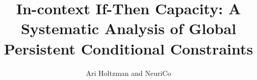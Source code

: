 \documentclass{article}
\title{In-context If-Then Capacity: A Systematic Analysis of Global Persistent Conditional Constraints}
\author{Ari Holtzman and NeuriCo}
\begin{document}
\maketitle

\begin{abstract}

\end{abstract}










\end{document}
